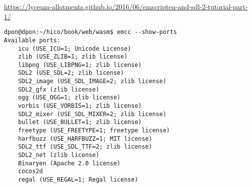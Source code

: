 

\url{https://lyceum-allotments.github.io/2016/06/emscripten-and-sdl-2-tutorial-part-1/}

\begin{verbatim}
dpon@dpon:~/hico/book/web/wasm$ emcc --show-ports
Available ports:
    icu (USE_ICU=1; Unicode License)
    zlib (USE_ZLIB=1; zlib license)
    libpng (USE_LIBPNG=1; zlib license)
    SDL2 (USE_SDL=2; zlib license)
    SDL2_image (USE_SDL_IMAGE=2; zlib license)
    SDL2_gfx (zlib license)
    ogg (USE_OGG=1; zlib license)
    vorbis (USE_VORBIS=1; zlib license)
    SDL2_mixer (USE_SDL_MIXER=2; zlib license)
    bullet (USE_BULLET=1; zlib license)
    freetype (USE_FREETYPE=1; freetype license)
    harfbuzz (USE_HARFBUZZ=1; MIT license)
    SDL2_ttf (USE_SDL_TTF=2; zlib license)
    SDL2_net (zlib license)
    Binaryen (Apache 2.0 license)
    cocos2d
    regal (USE_REGAL=1; Regal license)
\end{verbatim}
    